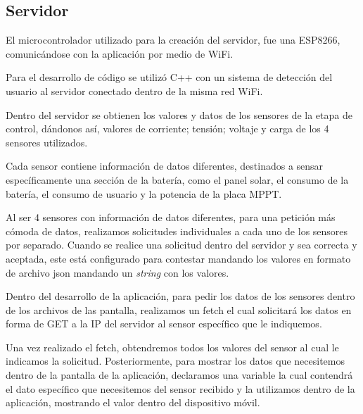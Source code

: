             \subsection{Servidor}
                El microcontrolador utilizado para la creación del servidor, fue una ESP8266, comunicándose con la aplicación por medio de WiFi.\par
                Para el desarrollo de código se utilizó C++ con un sistema de detección del usuario al servidor conectado dentro de la misma red WiFi.\par
                Dentro del servidor se obtienen los valores y datos de los sensores de la etapa de control, dándonos así, valores de corriente; tensión; voltaje y carga de los 4 sensores utilizados.\par
                Cada sensor contiene información de datos diferentes, destinados a sensar específicamente una sección de la batería, como el panel solar, el consumo de la batería, el consumo de usuario y la potencia de la placa MPPT.\par
                Al ser 4 sensores con información de datos diferentes, para una petición más cómoda de datos, realizamos solicitudes individuales a cada uno de los sensores por separado.
                Cuando se realice una solicitud dentro del servidor y sea correcta y aceptada, este está configurado para contestar mandando los valores en formato de archivo json mandando un \textit{string} con los valores.\par
                Dentro del desarrollo de la aplicación, para pedir los datos de los sensores dentro de los archivos de las pantalla, realizamos un fetch el cual solicitará los datos en forma de GET a la IP del servidor al sensor específico que le indiquemos.\par
                Una vez realizado el fetch, obtendremos todos los valores del sensor al cual le indicamos la solicitud. Posteriormente, para mostrar los datos que necesitemos dentro de la pantalla de la aplicación, declaramos una variable la cual contendrá el dato específico que necesitemos del sensor recibido y la utilizamos dentro de la aplicación, mostrando el valor dentro del dispositivo móvil.\par

            \newpage
            
